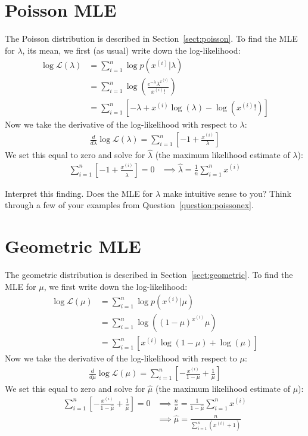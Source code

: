 \section{Poisson MLE}

The Poisson distribution is described in Section~\ref{sect:poisson}. To find the MLE for $\lambda$, its mean, we first (as usual) write down the log-likelihood:
\begin{align*}
\log \mathcal{L}(\lambda) &= \sum_{i=1}^n \log p(x^{(i)}|\lambda) \\
&= \sum_{i=1}^n \log \left( \frac{e^{-\lambda} \lambda^{x^{(i)}}}{x^{(i)}!} \right) \\
&= \sum_{i=1}^n \left[ -\lambda + x^{(i)} \log(\lambda) - \log(x^{(i)}!) \right] \end{align*}
Now we take the derivative of the log-likelihood with respect to $\lambda$:
\begin{align*}
\frac{d}{d \lambda} \log \mathcal{L}(\lambda) = \sum_{i=1}^n \left[ -1 + \frac{x^{(i)}}{\lambda} \right]
\end{align*}
We set this equal to zero and solve for $\hat{\lambda}$ (the maximum likelihood estimate of $\lambda$):
\begin{align*} \sum_{i=1}^n \left[ -1 + \frac{x^{(i)}}{\hat{\lambda}} \right] = 0 & \implies \boxed{\hat{\lambda} = \frac{1}{n} \sum_{i=1}^n x^{(i)}} \end{align*}

\begin{question}{}
Interpret this finding. Does the MLE for $\lambda$ make intuitive sense to you? Think through a few of your examples from Question~\ref{question:poissonex}. 
\end{question}

\section{Geometric MLE}

The geometric distribution is described in Section~\ref{sect:geometric}. To find the MLE for $\mu$, we first write down the log-likelihood:
\begin{align*}
\log \mathcal{L}(\mu) &= \sum_{i=1}^n \log p(x^{(i)}|\mu) \\
&= \sum_{i=1}^n \log \left( (1-\mu)^{x^{(i)}} \mu \right) \\
&= \sum_{i=1}^n \left[ x^{(i)} \log(1-\mu) + \log(\mu) \right] \end{align*}
Now we take the derivative of the log-likelihood with respect to $\mu$:
\begin{align*}
\frac{d}{d \mu} \log \mathcal{L}(\mu) = \sum_{i=1}^n \left[ -\frac{x^{(i)}}{1-\mu} + \frac{1}{\mu} \right]
\end{align*}
We set this equal to zero and solve for $\hat{\mu}$ (the maximum likelihood estimate of $\mu$):
\begin{align*} \sum_{i=1}^n \left[ -\frac{x^{(i)}}{1-\hat{\mu}} + \frac{1}{\hat{\mu}} \right] = 0 & \implies \frac{n}{\hat{\mu}} = \frac{1}{1 - \hat{\mu}} \sum_{i=1}^n x^{(i)} \\
& \implies \boxed{\hat{\mu} = \frac{n}{\sum_{i=1}^n (x^{(i)}+1)} }\end{align*}

